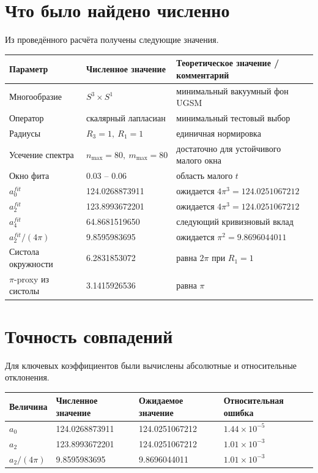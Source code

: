 \documentclass[12pt,a4paper]{article}
\begin{document}
\section{Что было найдено численно}

Из проведённого расчёта получены следующие значения.

\begin{longtable}{p{6.0cm}p{4.2cm}p{4.2cm}}
\toprule
Параметр & Численное значение & Теоретическое значение / комментарий \\
\midrule
\endhead
Многообразие & \(S^3\times S^1\) & минимальный вакуумный фон UGSM \\
Оператор & скалярный лапласиан & минимальный тестовый выбор \\
Радиусы & \(R_3=1,\ R_1=1\) & единичная нормировка \\
Усечение спектра & \(n_{\max}=80,\ m_{\max}=80\) & достаточно для устойчивого малого окна \\
Окно фита & \(0.03\) -- \(0.06\) & область малого \(t\) \\
\(a_0^{fit}\) & 124.0268873911 & ожидается \(4\pi^3=124.0251067212\) \\
\(a_2^{fit}\) & 123.8993672201 & ожидается \(4\pi^3=124.0251067212\) \\
\(a_4^{fit}\) & 64.8681519650 & следующий кривизновый вклад \\
\(a_2^{fit}/(4\pi)\) & 9.8595983695 & ожидается \(\pi^2=9.8696044011\) \\
Систола окружности & 6.2831853072 & равна \(2\pi\) при \(R_1=1\) \\
\(\pi\)-proxy из систолы & 3.1415926536 & равна \(\pi\) \\
\bottomrule
\end{longtable}

\section{Точность совпадений}

Для ключевых коэффициентов были вычислены абсолютные и относительные отклонения.

\begin{longtable}{p{4.8cm}p{3.4cm}p{3.8cm}p{3.4cm}}
\toprule
Величина & Численное значение & Ожидаемое значение & Относительная ошибка \\
\midrule
\endhead
\(a_0\) & 124.0268873911 & 124.0251067212 & \(1.44\times 10^{-5}\) \\
\(a_2\) & 123.8993672201 & 124.0251067212 & \(1.01\times 10^{-3}\) \\
\(a_2/(4\pi)\) & 9.8595983695 & 9.8696044011 & \(1.01\times 10^{-3}\) \\
\bottomrule
\end{longtable}
\end{document}
